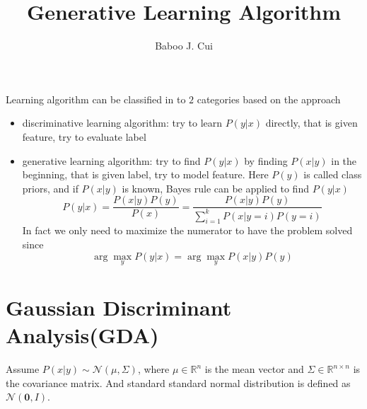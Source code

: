 \documentclass[10pt,a4paper,oneside]{article}
\author{Baboo J. Cui}
\begin{document}
\title{Generative Learning Algorithm}
\maketitle

Learning algorithm can be classified in to $2$ categories based on the approach
\begin{itemize}
	\item discriminative learning algorithm: try to learn $P(y|x)$ directly, that is given feature, try to evaluate label
	\item generative learning algorithm: try to find $P(y|x)$ by finding $P(x|y)$ in the beginning, that is given label, try to model feature. Here $P(y)$ is called class priors, and if $P(x|y)$ is known, Bayes rule can be applied to find $P(y|x)$
	\[
	P(y|x) = \frac{P(x|y)P(y)}{P(x)} =  \frac{P(x|y)P(y)}{\sum_{i=1}^{k} P(x| y=i)P(y=i)} 
	\]
	In fact we only need to maximize the numerator to have the problem solved since
	\[
	\arg \max _{y} P(y|x) = \arg \max _y P(x|y) P(y)
	\]
\end{itemize}

\section{Gaussian Discriminant Analysis(GDA)}
Assume $P(x|y) \sim \mathcal{N}(\mu, \Sigma)$, where $\mu \in \mathbb{R}^n$ is the mean vector and $\Sigma \in \mathbb{R}^{n\times n}$ is the covariance matrix. And standard standard normal distribution is defined as $\mathcal{N}(\textbf{0}, I)$.
\end{document}
